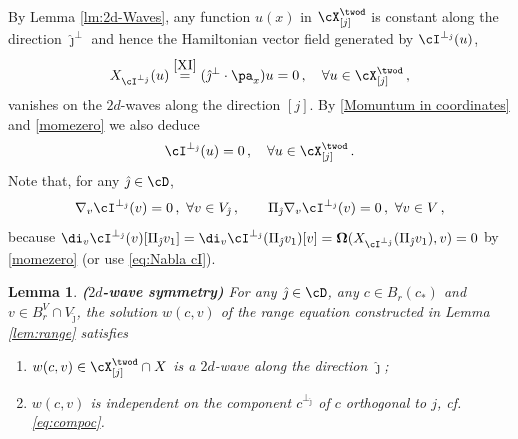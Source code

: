 \documentclass[11pt,a4paper,reqno]{article}
\numberwithin{equation}{section}
\newtheorem{lemma}[theorem]{Lemma}
\theoremstyle{definition}
\begin{document}
By Lemma \ref{lm:2d-Waves}, any function $u (x) $ in $ \cX^{\twod}_{[j]}$ is constant along the direction $\hat\jmath^{\bot}$ and hence the Hamiltonian vector field
generated by $ \cI^{\bot_{\hat \jmath}} (u) $,   
\begin{equation}\label{momezero}
X_{\cI^{\bot_{\hat \jmath}}}(u) \stackrel{\eqref{XI}} 
= (\hat\jmath^\bot \cdot \pa_x) u =0 \, , \quad \forall 
u\in \cX^{\twod}_{[j]} \, ,
\end{equation}
vanishes on the $ 2d$-waves along the direction $ [j]$. 
By \eqref{Momuntum in coordinates}  and 
\eqref{momezero} 
we also deduce
\begin{equation}\label{momezero2}
    \cI^{\bot_{\hat \jmath}}(u)=0\, , \quad \forall 
u\in \cX^{\twod}_{[j]} \, .
\end{equation}
Note that, for any $ \hat \jmath \in \cD $,   
\begin{equation}\label{pibot}
\nabla_v \cI^{\bot_{\hat\jmath}  } (v) = 0  \, , \  \forall v \in V_{\hat\jmath}  \, , 
\qquad 
\Pi_{\hat \jmath} \nabla_v \cI^{\bot_{\hat\jmath}} (v) = 0 \, , \  \forall v \in V \, , 
\end{equation}
because  $\di_v\cI^{\bot_{\hat \jmath}}(v)[\Pi_{\hat \jmath}v_1]=\di_v\cI^{\bot_{\hat \jmath}}(\Pi_{\hat \jmath}v_1)[v]= {\bf \Omega}(X_{\cI^{\bot_{\hat \jmath}}}(\Pi_{\hat \jmath}v_1),v) = 0 $ by \eqref{momezero}
(or use \eqref{eq:Nabla cI}). 


\begin{lemma}\label{Further properties of w(c,v)} {\bf ($2d$-wave symmetry)}
For any $ {\hat \jmath} \in \cD $, 
any $c\in B_r(c_*)$ and $v\in B_{r}^V 
\cap    V_{\hat \jmath}  $, 
the solution $ w(c, v) $ of the range equation constructed in Lemma
\ref{lem:range}
satisfies 
\begin{enumerate}
            \item[$(i)$]  $w(c,v) \in  \cX_{[j]}^{\twod} \cap X $
            is a $ 2 d $-wave along the direction ${\hat \jmath}$;
            \item[$(ii)$] \label{lem843} $w(c,v)$ is independent on the component $c^{\bot_{\hat \jmath}} $ of $ c $ orthogonal to $j$, cf. \eqref{eq:compoc}.
\end{enumerate}
\end{lemma}
\end{document}
